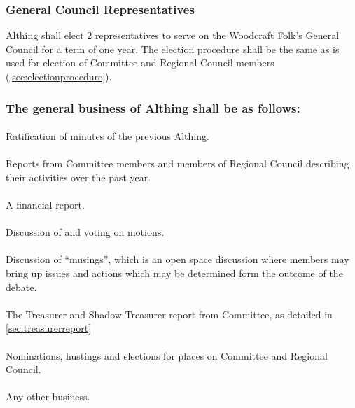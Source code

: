 \documentclass[a4paper, 12pt]{report}
\begin{document}
\subsubsection{General Council Representatives}
Althing shall elect 2 representatives to serve on the Woodcraft Folk's General Council for a term of one year. The election procedure shall be the same as is used for election of Committee and Regional Council members (\ref{sec:electionprocedure}).
\subsubsection{The general business of Althing shall be as follows:}
\paragraph{}
Ratification of minutes of the previous Althing.
\paragraph{}
Reports from Committee members and members of Regional Council describing their activities over the past year.
\paragraph{}
A financial report.
\paragraph{}
Discussion of and voting on motions.
\paragraph{}
Discussion of ``musings'', which is an open space discussion where members may bring up issues and actions which may be determined form the outcome of the debate.
\paragraph{}
The Treasurer and Shadow Treasurer report from Committee, as detailed in \ref{sec:treasurerreport}
\paragraph{}
Nominations, hustings and elections for places on Committee and Regional Council.
\paragraph{}
Any other business.
\end{document}

